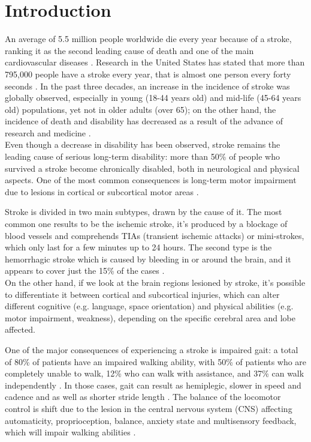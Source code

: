 \chapter{Introduction}
An average of 5.5 million people worldwide die every year because of a stroke, ranking it as the second leading cause of death and one of the main cardiovascular diseases \parencite{Donkor_2018}. Research in the United States has stated that more than 795,000 people have a stroke every year, that is almost one person every forty seconds \parencite{Tsao_2023}. In the past three decades, an increase in the incidence of stroke was globally observed, especially in young (18-44 years old) and mid-life (45-64 years old) populations, yet not in older adults (over 65); on the other hand, the incidence of death and disability has decreased as a result of the advance of research and medicine \parencite{Yahya_2020}. \\
Even though a decrease in disability has been observed, stroke remains the leading cause of serious long-term disability: more than 50\% of people who survived a stroke become chronically disabled, both in neurological and physical aspects. One of the most common consequences is long-term motor impairment due to lesions in cortical or subcortical motor areas \parencite{Karthikeyan_2019}. 

Stroke is divided in two main subtypes, drawn by the cause of it. The most common one results to be the ischemic stroke, it's produced by a blockage of blood vessels and comprehends TIAs (transient ischemic attacks) or mini-strokes, which only last for a few minutes up to 24 hours. The second type is the hemorrhagic stroke which is caused by bleeding in or around the brain, and it appears to cover just the 15\% of the cases \parencite{Abdu_2021}. \\
On the other hand, if we look at the brain regions lesioned by stroke, it's possible to differentiate it between cortical and subcortical injuries, which can alter different cognitive (e.g. language, space orientation) and physical abilities (e.g. motor impairment, weakness), depending on the specific cerebral area and lobe affected.  

One of the major consequences of experiencing a stroke is impaired gait: a total of 80\% of patients have an impaired walking ability, with 50\% of patients who are completely unable to walk, 12\% who can walk with assistance, and 37\% can walk independently \parencite{Balaban_2014}. In those cases, gait can result as hemiplegic, slower in speed and cadence and as well as shorter stride length \parencite{Gomez_2020}. The balance of the locomotor control is shift due to the lesion in the central nervous system (CNS) affecting automaticity, proprioception, balance, anxiety state and multisensory feedback, which will impair walking abilities \parencite{Clark_2015}. 

